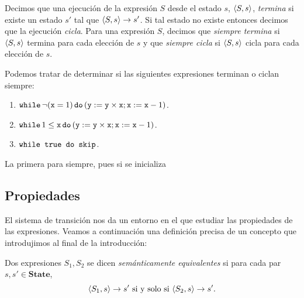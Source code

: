 \begin{definition}
Decimos que una ejecución de la expresión $S$ desde el estado $s$, $\langle S, s \rangle$, \textit{termina} si existe un estado $s'$ tal que $\langle S, s \rangle\rightarrow s'$. Si tal estado no existe entonces decimos que la ejecución \textit{cicla}. Para una expresión $S$, decimos que \textit{siempre termina} si $\langle S, s \rangle$ termina para cada elección de $s$ y que \textit{siempre cicla} si $\langle S, s \rangle$ cicla para cada elección de $s$.
\end{definition}

\begin{example}
Podemos tratar de determinar si las siguientes expresiones terminan o ciclan siempre:
\begin{enumerate}
    \item $\texttt{while} \, \neg(\texttt{x}=1) \, \texttt{do} \, (\texttt{y} := \texttt{y} \times \texttt{x}; \texttt{x} := \texttt{x} - 1)$.
    \item $\texttt{while} \, 1 \leq \texttt{x} \, \texttt{do} \, (\texttt{y} := \texttt{y} \times \texttt{x}; \texttt{x} := \texttt{x} - 1)$.
    \item $\texttt{while true do skip}$.
\end{enumerate}
La primera para siempre, pues si se inicializa
\end{example}

\subsection{Propiedades}

El sistema de transición nos da un entorno en el que estudiar las propiedades de las expresiones. Veamos a continuación una definición precisa de un concepto que introdujimos al final de la introducción:
\begin{definition}
Dos expresiones $S_1, S_2$ se dicen \textit{semánticamente equivalentes} si para cada par $s, s' \in \mathbf{State}$, 
$$\langle S_1, s \rangle\rightarrow s' \text{ si y solo si } \langle S_2, s \rangle\rightarrow s'.$$
\end{definition}

